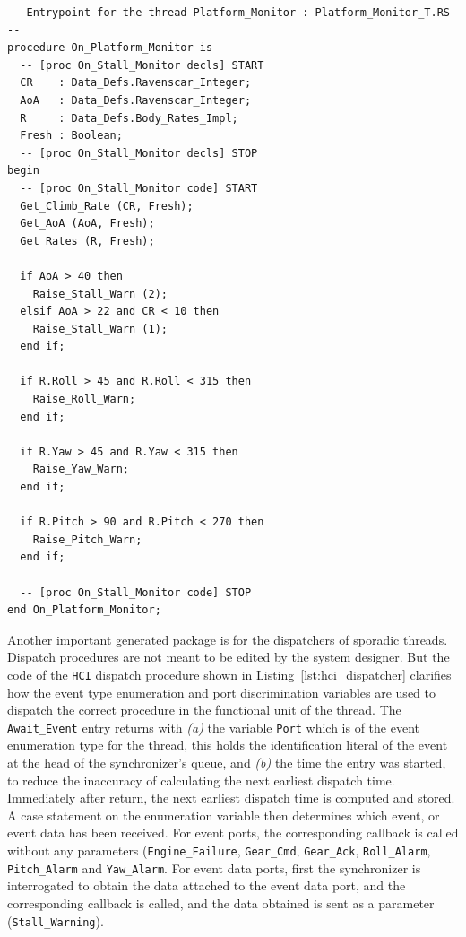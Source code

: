 \begin{minipage}{\listingwidth}
\lstset{language=ada}
\begin{lstlisting}[label=lst:platform_monitor,caption=Procedure called
    when \texttt{Platform\_Monitor} is dispatched]
-- Entrypoint for the thread Platform_Monitor : Platform_Monitor_T.RS --
procedure On_Platform_Monitor is
  -- [proc On_Stall_Monitor decls] START
  CR    : Data_Defs.Ravenscar_Integer;
  AoA   : Data_Defs.Ravenscar_Integer;
  R     : Data_Defs.Body_Rates_Impl;
  Fresh : Boolean;
  -- [proc On_Stall_Monitor decls] STOP
begin
  -- [proc On_Stall_Monitor code] START
  Get_Climb_Rate (CR, Fresh);
  Get_AoA (AoA, Fresh);
  Get_Rates (R, Fresh);

  if AoA > 40 then
    Raise_Stall_Warn (2);
  elsif AoA > 22 and CR < 10 then
    Raise_Stall_Warn (1);
  end if;

  if R.Roll > 45 and R.Roll < 315 then
    Raise_Roll_Warn;
  end if;

  if R.Yaw > 45 and R.Yaw < 315 then
    Raise_Yaw_Warn;
  end if;

  if R.Pitch > 90 and R.Pitch < 270 then
    Raise_Pitch_Warn;
  end if;

  -- [proc On_Stall_Monitor code] STOP
end On_Platform_Monitor;
\end{lstlisting}
\end{minipage}

Another important generated package is for the dispatchers of sporadic
threads. Dispatch procedures are not meant to be edited by the system
designer. But the code of the \texttt{HCI} dispatch procedure shown in
Listing~\ref{lst:hci_dispatcher} clarifies how the event type
enumeration and port discrimination variables are used to dispatch the
correct procedure in the functional unit of the thread. The
\texttt{Await\_Event} entry returns with \emph{(a)} the variable
\texttt{Port} which is of the event enumeration type for the thread,
this holds the identification literal of the event at the head of the
synchronizer's queue, and \emph{(b)} the time the entry was started,
to reduce the inaccuracy of calculating the next earliest dispatch
time. Immediately after return, the next earliest dispatch time is
computed and stored. A case statement on the enumeration variable then
determines which event, or event data has been received. For event
ports, the corresponding callback is called without any parameters
(\texttt{Engine\_Failure}, \texttt{Gear\_Cmd}, \texttt{Gear\_Ack},
\texttt{Roll\_Alarm}, \texttt{Pitch\_Alarm} and
\texttt{Yaw\_Alarm}. For event data ports, first the synchronizer is
interrogated to obtain the data attached to the event data port, and
the corresponding callback is called, and the data obtained is sent as
a parameter (\texttt{Stall\_Warning}).

